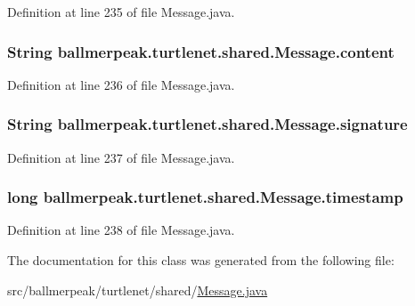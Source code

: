 Definition at line 235 of file Message.\-java.

\hypertarget{classballmerpeak_1_1turtlenet_1_1shared_1_1Message_a88b89de79f9fec571a22623688697de9}{
\subsubsection[{content}]{\setlength{\rightskip}{0pt plus 5cm}String ballmerpeak.\-turtlenet.\-shared.\-Message.\-content}}\label{classballmerpeak_1_1turtlenet_1_1shared_1_1Message_a88b89de79f9fec571a22623688697de9}


Definition at line 236 of file Message.\-java.

\hypertarget{classballmerpeak_1_1turtlenet_1_1shared_1_1Message_a71a41cba8610df3d655b4b417a0361bc}{
\subsubsection[{signature}]{\setlength{\rightskip}{0pt plus 5cm}String ballmerpeak.\-turtlenet.\-shared.\-Message.\-signature}}\label{classballmerpeak_1_1turtlenet_1_1shared_1_1Message_a71a41cba8610df3d655b4b417a0361bc}


Definition at line 237 of file Message.\-java.

\hypertarget{classballmerpeak_1_1turtlenet_1_1shared_1_1Message_acc5644d2bce101cdcc576cb1b87cdf70}{
\subsubsection[{timestamp}]{\setlength{\rightskip}{0pt plus 5cm}long ballmerpeak.\-turtlenet.\-shared.\-Message.\-timestamp}}\label{classballmerpeak_1_1turtlenet_1_1shared_1_1Message_acc5644d2bce101cdcc576cb1b87cdf70}


Definition at line 238 of file Message.\-java.



The documentation for this class was generated from the following file\-:\begin{DoxyCompactItemize}
\item 
src/ballmerpeak/turtlenet/shared/\hyperlink{Message_8java}{Message.\-java}\end{DoxyCompactItemize}
